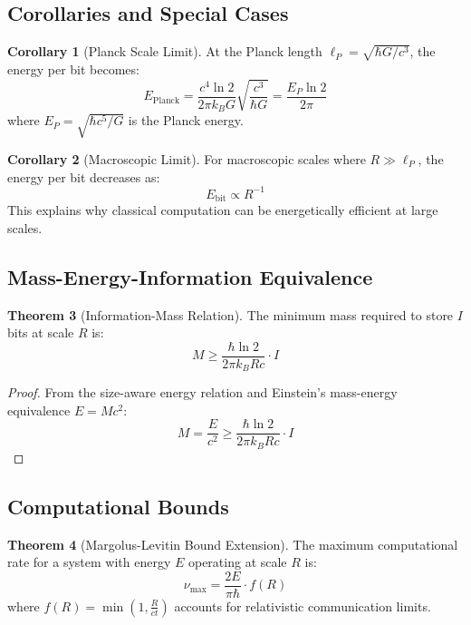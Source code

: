 \documentclass[11pt,a4paper]{article}
\theoremstyle{definition}
\newtheorem{theorem}{Theorem}[section]
\newtheorem{corollary}[theorem]{Corollary}
\begin{document}
\subsection{Corollaries and Special Cases}

\begin{corollary}[Planck Scale Limit]
At the Planck length $\ell_P = \sqrt{\hbar G/c^3}$, the energy per bit becomes:
\begin{equation}
E_{\text{Planck}} = \frac{c^4 \ln 2}{2\pi k_B G} \sqrt{\frac{c^3}{\hbar G}} = \frac{E_P \ln 2}{2\pi}
\end{equation}
where $E_P = \sqrt{\hbar c^5/G}$ is the Planck energy.
\end{corollary}

\begin{corollary}[Macroscopic Limit]
For macroscopic scales where $R \gg \ell_P$, the energy per bit decreases as:
\begin{equation}
E_{\text{bit}} \propto R^{-1}
\end{equation}
This explains why classical computation can be energetically efficient at large scales.
\end{corollary}

\subsection{Mass-Energy-Information Equivalence}

\begin{theorem}[Information-Mass Relation]
The minimum mass required to store $I$ bits at scale $R$ is:
\begin{equation}
M \geq \frac{\hbar \ln 2}{2\pi k_B R c} \cdot I
\end{equation}
\end{theorem}

\begin{proof}
From the size-aware energy relation and Einstein's mass-energy equivalence $E = Mc^2$:
\begin{equation}
M = \frac{E}{c^2} \geq \frac{\hbar \ln 2}{2\pi k_B R c} \cdot I
\end{equation}
\end{proof}

\subsection{Computational Bounds}

\begin{theorem}[Margolus-Levitin Bound Extension]
The maximum computational rate for a system with energy $E$ operating at scale $R$ is:
\begin{equation}
\nu_{\text{max}} = \frac{2E}{\pi \hbar} \cdot f(R)
\end{equation}
where $f(R) = \min\left(1, \frac{R}{ct}\right)$ accounts for relativistic communication limits.
\end{theorem}
\end{document}
